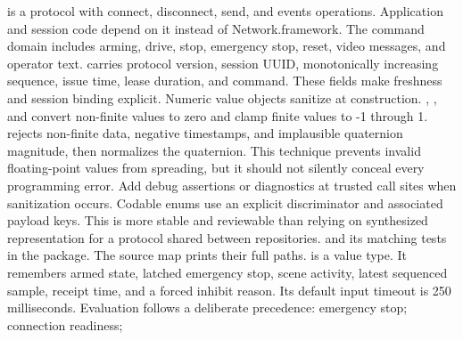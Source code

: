 {} is a  protocol with connect, disconnect, send, and events operations. Application and session code depend on it instead of Network.framework.\markdownRendererParagraphSeparator
{}The command domain includes arming, drive, stop, emergency stop, reset, video messages, and operator text.  carries protocol version, session UUID, monotonically increasing sequence, issue time, lease duration, and command. These fields make freshness and session binding explicit.\markdownRendererParagraphSeparator
{}Numeric value objects sanitize at construction. , , and  convert non-finite values to zero and clamp finite values to -1 through 1.  rejects non-finite data, negative timestamps, and implausible quaternion magnitude, then normalizes the quaternion.\markdownRendererParagraphSeparator
{}This technique prevents invalid floating-point values from spreading, but it should not silently conceal every programming error. Add debug assertions or diagnostics at trusted call sites when sanitization occurs.\markdownRendererParagraphSeparator
{}Codable enums use an explicit  discriminator and associated payload keys. This is more stable and reviewable than relying on synthesized representation for a protocol shared between repositories.\markdownRendererInterblockSeparator
{}
\markdownRendererSectionEnd \markdownRendererSectionBegin
{}\markdownRendererInterblockSeparator
{}\markdownRendererBlockQuoteBegin
{}  and its matching tests in the package. The source map prints their full paths.\markdownRendererBlockQuoteEnd \markdownRendererInterblockSeparator
{} is a value type. It remembers armed state, latched emergency stop, scene activity, latest sequenced sample, receipt time, and a forced inhibit reason. Its default input timeout is 250 milliseconds.\markdownRendererParagraphSeparator
{}Evaluation follows a deliberate precedence:\markdownRendererInterblockSeparator
{}\markdownRendererOlBegin
{}emergency stop;\markdownRendererOlItemEnd 
{}connection readiness;\markdownRendererOlItemEnd 
